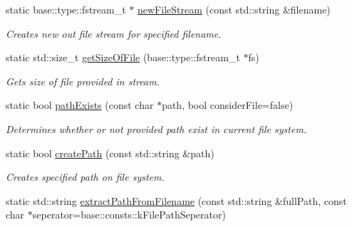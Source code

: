 \begin{DoxyCompactItemize}
\item 
static base\-::type\-::fstream\-\_\-t $\ast$ \hyperlink{classel_1_1base_1_1utils_1_1File_aa4bef1f2e00269d75c1c1eabb0ce4563}{new\-File\-Stream} (const std\-::string \&filename)
\begin{DoxyCompactList}\small\item\em Creates new out file stream for specified filename. \end{DoxyCompactList}\item 
\hypertarget{classel_1_1base_1_1utils_1_1File_a54415ba02f698ba978795265f7f4b86c}{static std\-::size\-\_\-t \hyperlink{classel_1_1base_1_1utils_1_1File_a54415ba02f698ba978795265f7f4b86c}{get\-Size\-Of\-File} (base\-::type\-::fstream\-\_\-t $\ast$fs)}\label{classel_1_1base_1_1utils_1_1File_a54415ba02f698ba978795265f7f4b86c}

\begin{DoxyCompactList}\small\item\em Gets size of file provided in stream. \end{DoxyCompactList}\item 
\hypertarget{classel_1_1base_1_1utils_1_1File_a4fc9e36b814f1aeaa4931e35d58e5b45}{static bool \hyperlink{classel_1_1base_1_1utils_1_1File_a4fc9e36b814f1aeaa4931e35d58e5b45}{path\-Exists} (const char $\ast$path, bool consider\-File=false)}\label{classel_1_1base_1_1utils_1_1File_a4fc9e36b814f1aeaa4931e35d58e5b45}

\begin{DoxyCompactList}\small\item\em Determines whether or not provided path exist in current file system. \end{DoxyCompactList}\item 
static bool \hyperlink{classel_1_1base_1_1utils_1_1File_a34fbb5b06201c7e3db71db80e017fb96}{create\-Path} (const std\-::string \&path)
\begin{DoxyCompactList}\small\item\em Creates specified path on file system. \end{DoxyCompactList}\item 
\hypertarget{classel_1_1base_1_1utils_1_1File_af541c62ed408de7e368d339f96c0c6cf}{static std\-::string \hyperlink{classel_1_1base_1_1utils_1_1File_af541c62ed408de7e368d339f96c0c6cf}{extract\-Path\-From\-Filename} (const std\-::string \&full\-Path, const char $\ast$seperator=base\-::consts\-::k\-File\-Path\-Seperator)}\label{classel_1_1base_1_1utils_1_1File_af541c62ed408de7e368d339f96c0c6cf}


\end{DoxyCompactItemize}
